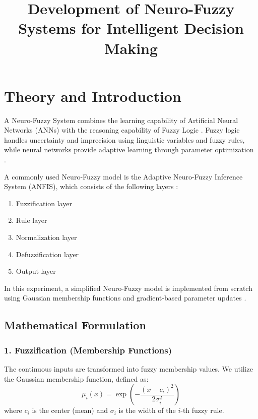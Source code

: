 \documentclass[11pt]{article}
\title{Development of Neuro-Fuzzy Systems for Intelligent Decision Making}
\author{}
\date{}
\begin{document}


\pagebreak

\tableofcontents

\pagebreak
{}
\maketitle
\section{Theory and Introduction}
A Neuro-Fuzzy System combines the learning capability of Artificial Neural Networks (ANNs) with the reasoning capability of Fuzzy Logic \cite{lin1996neural}. Fuzzy logic handles uncertainty and imprecision using linguistic variables and fuzzy rules, while neural networks provide adaptive learning through parameter optimization \cite{jang1997neuro}.

A commonly used Neuro-Fuzzy model is the Adaptive Neuro-Fuzzy Inference System (ANFIS), which consists of the following layers \cite{jang1993anfis}:
\begin{enumerate}
    \item Fuzzification layer
    \item Rule layer
    \item Normalization layer
    \item Defuzzification layer
    \item Output layer
\end{enumerate}

In this experiment, a simplified Neuro-Fuzzy model is implemented from scratch using Gaussian membership functions and gradient-based parameter updates \cite{jang1997neuro}.

\subsection{Mathematical Formulation}
\subsubsection*{1. Fuzzification (Membership Functions)}
The continuous inputs are transformed into fuzzy membership values. We utilize the Gaussian membership function, defined as:
\begin{equation}
    \mu_i(x) = \exp\left(-\frac{(x - c_i)^2}{2\sigma_i^2}\right)
\end{equation}
where $c_i$ is the center (mean) and $\sigma_i$ is the width of the $i$-th fuzzy rule.
\end{document}
